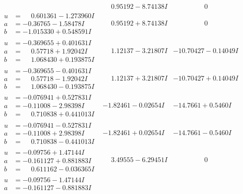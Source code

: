 \documentclass[1p]{elsarticle_modified}
\theoremstyle{definition}
\begin{document}
$$\begin{array}{c|c|c}
 & \phantom{-}0.95192 - 8.74138 I & \phantom{-0.000000 } 0 \\ \hline\begin{aligned}
u &= \phantom{-}0.601361 - 1.273960 I \\
a &= -0.36765 - 1.58478 I \\
b &= -1.015330 + 0.548591 I\end{aligned}
 & \phantom{-}0.95192 + 8.74138 I & \phantom{-0.000000 } 0 \\ \hline\begin{aligned}
u &= -0.369655 + 0.401631 I \\
a &= \phantom{-}0.57718 + 1.92042 I \\
b &= \phantom{-}1.068430 + 0.193875 I\end{aligned}
 & \phantom{-}1.12137 - 3.21807 I & -10.70427 - 0.14049 I \\ \hline\begin{aligned}
u &= -0.369655 - 0.401631 I \\
a &= \phantom{-}0.57718 - 1.92042 I \\
b &= \phantom{-}1.068430 - 0.193875 I\end{aligned}
 & \phantom{-}1.12137 + 3.21807 I & -10.70427 + 0.14049 I \\ \hline\begin{aligned}
u &= -0.076941 + 0.527831 I \\
a &= -0.11008 - 2.98398 I \\
b &= \phantom{-}0.710838 + 0.441013 I\end{aligned}
 & -1.82461 - 0.02654 I & -14.7661 + 0.5460 I \\ \hline\begin{aligned}
u &= -0.076941 - 0.527831 I \\
a &= -0.11008 + 2.98398 I \\
b &= \phantom{-}0.710838 - 0.441013 I\end{aligned}
 & -1.82461 + 0.02654 I & -14.7661 - 0.5460 I \\ \hline\begin{aligned}
u &= -0.09756 + 1.47144 I \\
a &= -0.161127 + 0.881883 I \\
b &= \phantom{-}0.611162 - 0.036365 I\end{aligned}
 & \phantom{-}3.49555 - 6.29451 I & \phantom{-0.000000 } 0 \\ \hline\begin{aligned}
u &= -0.09756 - 1.47144 I \\
a &= -0.161127 - 0.881883 I \\

\end{aligned}
\end{array}$$
\end{document}
